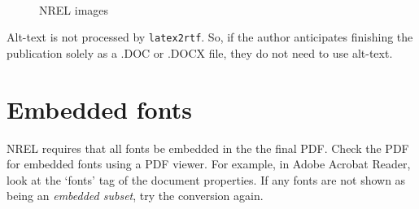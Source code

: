 \begin{figure}[!h]
\centering
\hfill
{}
~ %
\hfill
{}
\hfill
\caption{NREL images}\label{fig:NRELimagesWithAltText}
\end{figure}

Alt-text is not processed by \texttt{latex2rtf}. So, if the author anticipates finishing the publication solely as a .DOC or .DOCX file, they do not need to use alt-text.

\section{Embedded fonts}
NREL requires that all fonts be embedded in the the final PDF. Check the PDF for embedded fonts using a PDF viewer. For example, in Adobe Acrobat Reader, look at the `fonts' tag of the document properties. If any fonts are not shown as being an \emph{embedded subset}, try the conversion again. 

